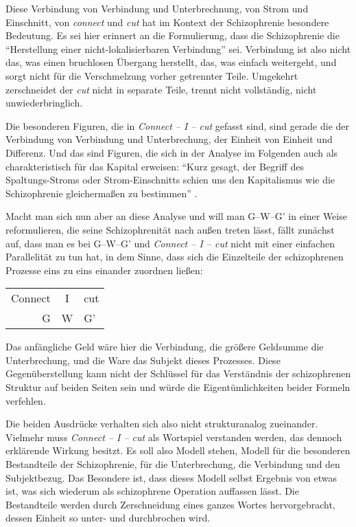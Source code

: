 \documentclass[12pt,
               paper=a4,
               twoside=false,
               onehalfspacing,
               bibliography=totoc,
               toc=graduated,
               ]{scrartcl}
\newcommand{\pc}[2]{\parencite[#1]{#2}}
\newcommand{\worries}[1]{\ifdraft{\textcolor{blue}{\texttt{(#1)}}}{}}
\newcommand{\gwg}{G--W--G'\xspace}
\newcommand{\cic}{Connect -- I -- cut\xspace}
\begin{document}

Diese Verbindung von Verbindung und Unterbrechnung, von Strom und
Einschnitt, von \emph{connect} und \emph{cut} hat im Kontext der
Schizophrenie besondere Bedeutung. Es sei hier erinnert an die
Formulierung, dass die Schizophrenie die "`Herstellung einer
nicht-lokalisierbaren Verbindung"' \pc{19}{schizg} sei. Verbindung ist
also nicht das, was einen bruchlosen Übergang herstellt, das, was
einfach weitergeht, und sorgt nicht für die Verschmelzung vorher
getrennter Teile. Umgekehrt zerschneidet der \emph{cut} nicht in
separate Teile, trennt nicht vollständig, nicht unwiederbringlich.

Die besonderen Figuren, die in \emph{\cic} gefasst sind, sind gerade
die der Verbindung von Verbindung und Unterbrechung, der Einheit von
Einheit und Differenz. Und das sind Figuren, die sich in der Analyse
im Folgenden auch als charakteristisch für das Kapital erweisen:
"`Kurz gesagt, der Begriff des Spaltungs-Stroms oder Strom-Einschnitts
schien uns den Kapitalismus wie die Schizophrenie gleichermaßen zu
bestimmen"' \pc{317}{ao}.



Macht man sich nun aber an diese Analyse und will man \gwg in einer
Weise reformulieren, die seine Schizophrenität nach außen treten
lässt, fällt zunächst auf, dass man es bei \gwg und \emph{\cic} nicht
mit einer einfachen Parallelität zu tun hat, in dem Sinne, dass sich
die Einzelteile der schizophrenen Prozesse eins zu eins einander
zuordnen ließen:

{\centering\hfill
\begin{tabular}{r@{ -- }c@{ -- }l}
Connect & I & cut\\
G & W & G'
\end{tabular}
\hfill}

Das anfängliche Geld wäre hier die Verbindung, die größere Geldsumme
die Unterbrechung, und die Ware das Subjekt dieses Prozesses. Diese
Gegenüberstellung kann nicht der Schlüssel für das Verständnis der
schizophrenen Struktur auf beiden Seiten sein und würde die
Eigentümlichkeiten beider Formeln verfehlen.

Die beiden Ausdrücke verhalten sich also nicht strukturanalog
zueinander. Vielmehr muss \emph{\cic} als Wortspiel verstanden werden,
das dennoch erklärende Wirkung besitzt. Es soll also Modell stehen,
Modell für die besonderen Bestandteile der Schizophrenie, für die
Unterbrechung, die Verbindung und den Subjektbezug. Das Besondere ist,
dass dieses Modell selbst Ergebnis von etwas ist, was sich wiederum
als schizophrene Operation auffassen lässt. Die Bestandteile werden
durch Zerschneidung eines ganzes Wortes hervorgebracht, dessen Einheit
so unter- und durchbrochen wird.
\end{document}
